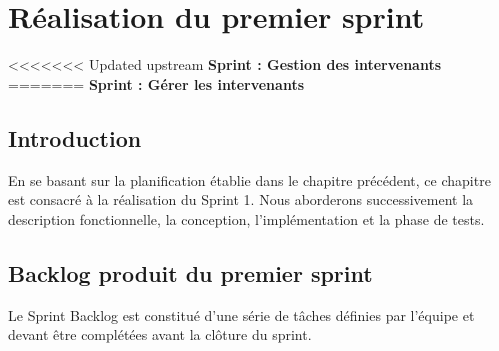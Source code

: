 \raggedbottom
\chapter{Réalisation du premier sprint}
\label{Chapitre_3}

<<<<<<< Updated upstream
{\Large\textbf{Sprint : Gestion des intervenants}}
=======
{\Large\textbf{Sprint : Gérer les intervenants}}

\section{Introduction}
\label{Chapitre3_Introduction}
En se basant sur la planification établie dans le chapitre précédent, ce chapitre est consacré à la réalisation du Sprint 1. Nous aborderons successivement la description fonctionnelle, la conception, l'implémentation et la phase de tests.


\newpage

\section{Backlog produit du premier sprint}
\label{sec:backlog_sprint1}

Le Sprint Backlog est constitué d'une série de tâches définies par l'équipe 
et devant être complétées avant la clôture du sprint.\cite{atlassian}

